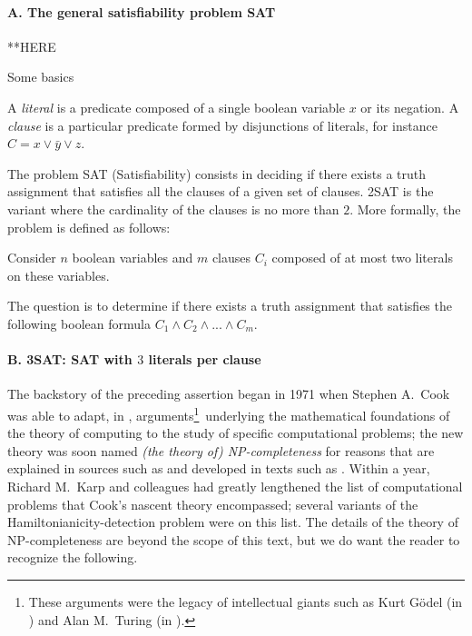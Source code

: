 \paragraph{\small\sf A. The general satisfiability problem SAT}

**HERE

Some basics

A \textit{literal} is a predicate composed of a single boolean
variable $x$ or its negation.  A \textit{clause} is a particular
predicate formed by disjunctions of literals, for instance $C = x \vee
\bar{y} \vee z$.

The problem SAT (Satisfiability) consists in deciding if there exists
a truth assignment that satisfies all the clauses of a given set of
clauses.  2SAT is the variant where the cardinality of the clauses is
no more than $2$.  More formally, the problem is defined as follows:

Consider $n$ boolean variables and $m$ clauses $C_i$ composed of at
most two literals on these variables.

The question is to determine if there exists a truth assignment that
satisfies the following boolean formula $C_1 \wedge C_2 \wedge
... \wedge C_m$.

\paragraph{\small\sf B. 3SAT: SAT with $3$ literals per clause}



The backstory of the preceding assertion began in 1971 when Stephen
A.~Cook  was able to adapt, in \cite{Cook71},
arguments\footnote{These arguments were the legacy of intellectual
  giants such as Kurt G\"{o}del  (in
  \cite{Goedel31}) and Alan M.~Turing  (in
  \cite{Turing36}).}~underlying the mathematical foundations of the
theory of computing to the study of specific computational problems;
the new theory was soon named {\it (the theory of) {\sf
    NP}-completeness}  for reasons that
are explained in sources such as  and developed in
texts such as .  Within a year, Richard M.~Karp
 and colleagues had greatly lengthened the
list of computational problems that Cook's nascent theory encompassed;
several variants of the Hamiltonianicity-detection problem were on
this list.  The details of the theory of {\sf NP}-completeness are
beyond the scope of this text, but we do want the reader to recognize
the following.

